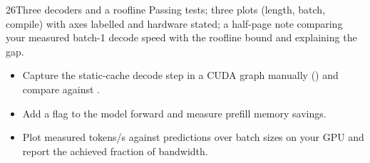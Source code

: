 \begin{labbox}{26}{Three decoders and a roofline}
Passing tests; three plots (length, batch, compile) with axes labelled and hardware stated; a
half-page note comparing your measured batch-1 decode speed with the roofline bound and explaining
the gap.

\begin{itemize}
  \item Capture the static-cache decode step in a CUDA graph manually ()
    and compare against .
  \item Add a  flag to the model forward and measure prefill memory savings.
  \item Plot measured tokens/s against  predictions over batch sizes on your GPU
    and report the achieved fraction of bandwidth.
\end{itemize}
\end{labbox}
